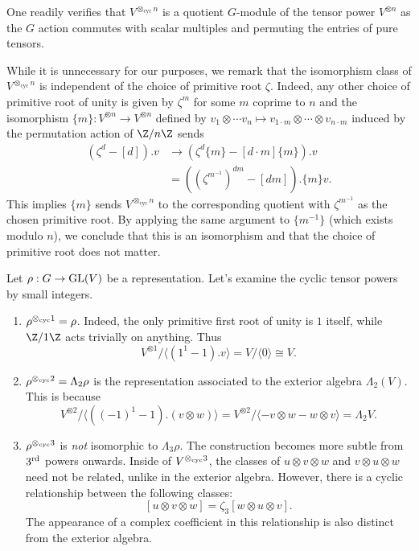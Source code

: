 \documentclass[12pt]{amsart}
\newenvironment{BOXexample}{
\begin{exbox}\mbox{}
\begin{example}
}
{
\end{example}
\end{exbox}
}
\theoremstyle{plain}
\begin{document}
One readily verifies that $V^{\otimes_{\text{cyc}} n}$ is a quotient $G$-module of the tensor power $V^{\otimes n}$ as the $G$ action commutes with scalar multiples and permuting the entries of pure tensors.

While it is unnecessary for our purposes, we remark that the isomorphism class of $V^{\otimes_{\text{cyc}} n}$ is independent of the choice of primitive root $\zeta$. Indeed, any other choice of primitive root of unity is given by $\zeta^m$ for some $m$ coprime to $n$ and the isomorphism $\{m\}:V^{\otimes n}\to V^{\otimes n}$ defined by $v_1\otimes \cdots v_n \mapsto  v_{1\cdot m} \otimes \cdots \otimes v_{n\cdot m}$ induced by the permutation action of $\Z/n\Z$ sends
\begin{align*}
(\zeta^d - [d]).v &\to (\zeta^d \{m\} - [d\cdot m]\{m\}).v\\
&= ((\zeta^{m^{-1}})^{dm} - [dm]).\{m\}v.
\end{align*}
This implies $\{m\}$ sends $V^{\otimes_{\text{cyc}} n}$ to the corresponding quotient with $\zeta^{m^{-1}}$ as the chosen primitive root. By applying the same argument to $\{m^{-1}\}$ (which exists modulo $n$), we conclude that this is an isomorphism and that the choice of primitive root does not matter.

\begin{BOXexample}
    Let $\rho:G\to {\rm GL}(V)$ be a representation. Let's examine the cyclic tensor powers by small integers.
    \begin{enumerate}[(1)]
        \item $\rho^{\otimes_{\rm cyc} 1} = \rho$. Indeed, the only primitive first root of unity is $1$ itself, while $\Z/1\Z$ acts trivially on anything. Thus
        \[
            V^{\otimes 1}/\langle (1^1 - 1).v\rangle = V/\langle 0\rangle \cong V.
        \]
        \item $\rho^{\otimes_{\rm cyc} 2}=\Lambda_2\rho$ is the representation associated to the exterior algebra $\Lambda_2(V)$. This is because
        \[
            V^{\otimes 2}/\langle ((-1)^1 - 1).(v\otimes w)\rangle = V^{\otimes 2}/\langle -v\otimes w - w\otimes v\rangle = \Lambda_2 V.
        \]
        \item $\rho^{\otimes_{\rm cyc} 3}$ is \emph{not} isomorphic to $\Lambda_3\rho$. The construction becomes more subtle from $3^{\rm rd}$ powers onwards. Inside of $V^{\otimes_{\rm cyc} 3}$, the classes of $u\otimes v\otimes w$ and $v\otimes u\otimes w$ need not be related, unlike in the exterior algebra. However, there is a cyclic relationship between the following classes:
        \[
            [u\otimes v\otimes w] = \zeta_3 [w\otimes u\otimes v].
        \]
        The appearance of a complex coefficient in this relationship is also distinct from the exterior algebra.
    \end{enumerate}
\end{BOXexample}
\end{document}
